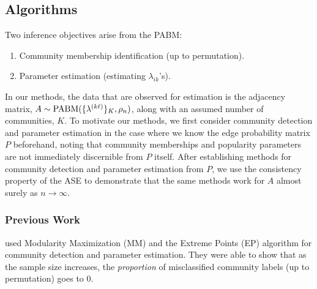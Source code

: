 \documentclass[
  11pt,
]{article}
\providecommand{\tightlist}{%
  \setlength{\itemsep}{0pt}\setlength{\parskip}{0pt}}
\theoremstyle{definition}
\theoremstyle{definition}
\theoremstyle{definition}
\theoremstyle{definition}
\theoremstyle{remark}
\begin{document}
\hypertarget{algorithms}{%
\subsection{Algorithms}\label{algorithms}}

Two inference objectives arise from the PABM:

\begin{enumerate}
\def\labelenumi{\arabic{enumi}.}
\tightlist
\item
  Community membership identification (up to permutation).
\item
  Parameter estimation (estimating $\lambda_{ik}$'s).
\end{enumerate}

In our methods, the data that are observed for estimation is the adjacency matrix, \(A \sim \mathrm{PABM}(\{\lambda^{(k \ell)}\}_K, \rho_n)\), along with an assumed number of communities, \(K\).
To motivate our methods, we first consider community detection and parameter estimation in the case where we know the edge probability matrix \(P\) beforehand, noting that community memberships and popularity parameters are not immediately discernible from \(P\) itself.
After establishing methods for community detection and parameter estimation from \(P\), we use the consistency property of the ASE \citep{doi:10.1080/01621459.2012.699795,rubindelanchy2017statistical} to demonstrate that the same methods work for \(A\) almost surely as \(n \to \infty\).

\hypertarget{previous-work}{%
\subsubsection{Previous Work}\label{previous-work}}

\citet{307cbeb9b1be48299388437423d94bf1}
used Modularity Maximization (MM) and the Extreme Points (EP)
algorithm \citep{le2016} for community detection and parameter
estimation. They were able to show that as the sample size increases,
the \emph{proportion} of misclassified community labels (up to permutation)
goes to 0.
\end{document}
